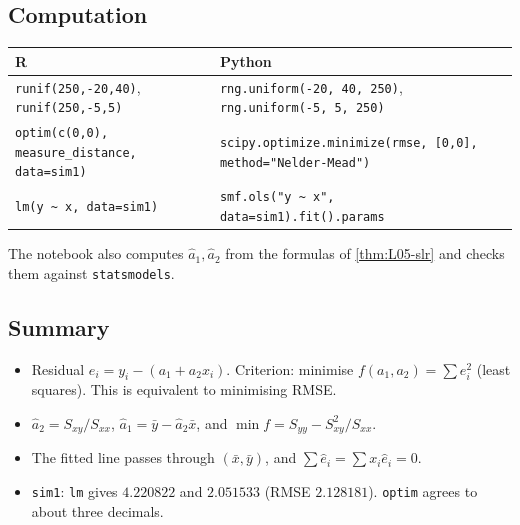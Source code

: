 \subsection{Computation}
\begin{center}\small
\begin{tabular}{@{}>{\raggedright\arraybackslash}p{7cm}>{\raggedright\arraybackslash}p{8.4cm}@{}}\hline
R & Python\\\hline
\texttt{runif(250,-20,40)}, \texttt{runif(250,-5,5)} & \texttt{rng.uniform(-20, 40, 250)}, \texttt{rng.uniform(-5, 5, 250)}\\
\texttt{optim(c(0,0), measure\_distance, data=sim1)} & \texttt{scipy.optimize.minimize(rmse, [0,0], method="Nelder-Mead")}\\
\texttt{lm(y \textasciitilde\ x, data=sim1)} & \texttt{smf.ols("y \textasciitilde\ x", data=sim1).fit().params}\\\hline
\end{tabular}
\end{center}
The notebook  also computes $\hat a_1,\hat a_2$ from
the formulas of \cref{thm:L05-slr} and checks them against \texttt{statsmodels}.

\subsection{Summary}
\begin{itemize}
  \item Residual $e_i=y_i-(a_1+a_2x_i)$. Criterion: minimise $f(a_1,a_2)=\sum e_i^2$ (least squares). This is equivalent to minimising RMSE.
  \item $\hat a_2=S_{xy}/S_{xx}$, $\hat a_1=\bar y-\hat a_2\bar x$, and $\min f=S_{yy}-S_{xy}^2/S_{xx}$.
  \item The fitted line passes through $(\bar x,\bar y)$, and $\sum\hat e_i=\sum x_i\hat e_i=0$.
  \item \texttt{sim1}: \texttt{lm} gives $4.220822$ and $2.051533$ (RMSE $2.128181$). \texttt{optim} agrees to about three decimals.
\end{itemize}

